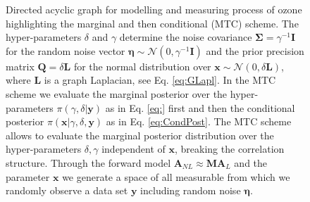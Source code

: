 \begin{figure}[htb!]
	\centering
	\caption[Directed acyclic graph for ozone retrieval and MTC scheme.]{Directed acyclic graph for modelling and measuring process of ozone highlighting the marginal and then conditional (MTC) scheme. The hyper-parameters $\delta$ and $\gamma$ determine the noise covariance $\bm{\Sigma} = \gamma^{-1}\bm{I}$ for the random noise vector $\bm{\eta} \sim \mathcal{N}(0, \gamma^{-1}\bm{I})$ and the prior precision matrix $\bm{Q} = \delta \bm{L}$ for the normal distribution over $\bm{x} \sim \mathcal{N}(0, \delta \bm{L})$, where $\bm{L}$ is a graph Laplacian, see Eq. \ref{eq:GLapl}. In the MTC scheme we evaluate the marginal posterior over the hyper-parameters $\pi(\gamma, \delta | \bm{y})$ as in Eq. \ref{eq:} first and then the conditional posterior $\pi(\bm{x}|\gamma,\delta,\bm{y})$ as in Eq. \ref{eq:CondPost}. The MTC scheme allows to evaluate the marginal posterior distribution over the hyper-parameters $\delta, \gamma$ independent of $\bm{x}$, breaking the correlation structure.
	Through the forward model $\bm{A}_{NL} \approx \bm{M}\bm{A}_L$ and the parameter $\bm{x}$ we generate a space of all measurable from which we randomly observe a data set $\bm{y}$ including random noise $\bm{\eta}$.}
	\label{fig:DAGO3}
\end{figure}

